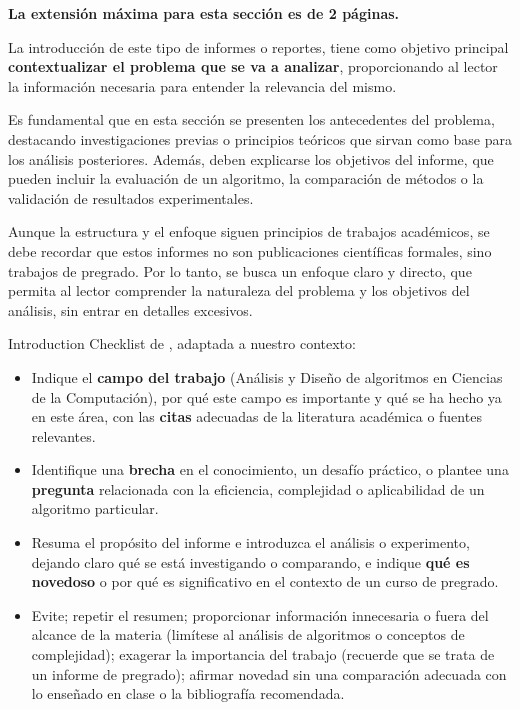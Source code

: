 \begin{mdframed}
    \textbf{La extensión máxima para esta sección es de 2 páginas.}
\end{mdframed}

La introducción de este tipo de informes o reportes, tiene como objetivo principal \textbf{contextualizar el problema que se va a analizar}, proporcionando al lector la información necesaria para entender la relevancia del mismo. 

Es fundamental que en esta sección se presenten los antecedentes del problema, destacando investigaciones previas o principios teóricos que sirvan como base para los análisis posteriores. Además, deben explicarse los objetivos del informe, que pueden incluir la evaluación de un algoritmo, la comparación de métodos o la validación de resultados experimentales.

Aunque la estructura y el enfoque siguen principios de trabajos académicos, se debe recordar que estos informes no son publicaciones científicas formales, sino trabajos de pregrado. Por lo tanto, se busca un enfoque claro y directo, que permita al lector comprender la naturaleza del problema y los objetivos del análisis, sin entrar en detalles excesivos. 


Introduction Checklist de  \cite{GoodScientificPaper}, adaptada a nuestro contexto:

\begin{itemize}
\item Indique el \textbf{campo del trabajo} (Análisis y Diseño de algoritmos en Ciencias de la Computación), por qué este campo es importante y qué se ha hecho ya en este área, con las \textbf{citas} adecuadas de la literatura académica o fuentes relevantes.
\item Identifique una \textbf{brecha} en el conocimiento, un desafío práctico, o plantee una \textbf{pregunta} relacionada con la eficiencia, complejidad o aplicabilidad de un algoritmo particular.
\item Resuma el propósito del informe e introduzca el análisis o experimento, dejando claro qué se está investigando o comparando, e indique \textbf{qué es novedoso} o por qué es significativo en el contexto de un curso de pregrado.
\item Evite; repetir el resumen; proporcionar información innecesaria o fuera del alcance de la materia (limítese al análisis de algoritmos o conceptos de complejidad); exagerar la importancia del trabajo (recuerde que se trata de un informe de pregrado); afirmar novedad sin una comparación adecuada con lo enseñado en clase o la bibliografía recomendada.
\end{itemize}



